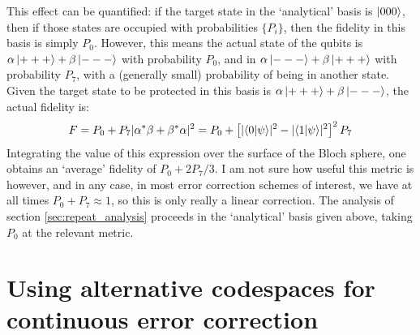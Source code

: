 \documentclass{report}
\begin{document}
\begin{appendices}
This effect can be quantified: if the target state in the `analytical' basis is $\ket{000}$, then if those states are occupied with probabilities $\{P_i\}$, then the fidelity in this basis is simply $P_0$. However, this means the actual state of the qubits is $\alpha \ket{+++} + \beta \ket{---}$ with probability $P_0$, and in $\alpha \ket{---} + \beta \ket{+++}$ with probability $P_7$, with a (generally small) probability of being in another state. Given the target state to be protected in this basis is $\alpha \ket{+++} + \beta \ket{---}$, the actual fidelity is:
\begin{align*}
    F = P_0 + P_7|\alpha^* \beta + \beta^* \alpha|^2 = P_0 + \left[\lvert\braket{0|\psi}\rvert^2 - \lvert\braket{1|\psi}\rvert^2\right]^2P_7
\end{align*}
Integrating the value of this expression over the surface of the Bloch sphere, one obtains an `average' fidelity of $P_0 + 2P_7/3$. I am not sure how useful this metric is however, and in any case, in most error correction schemes of interest, we have at all times $P_0 + P_7 \approx 1$, so this is only really a linear correction. The analysis of section \ref{sec:repeat_analysis} proceeds in the `analytical' basis given above, taking $P_0$ at the relevant metric.

\chapter{Using alternative codespaces for continuous error correction}\label{appendix:evenparitycodespace}


\end{appendices}
\end{document}
